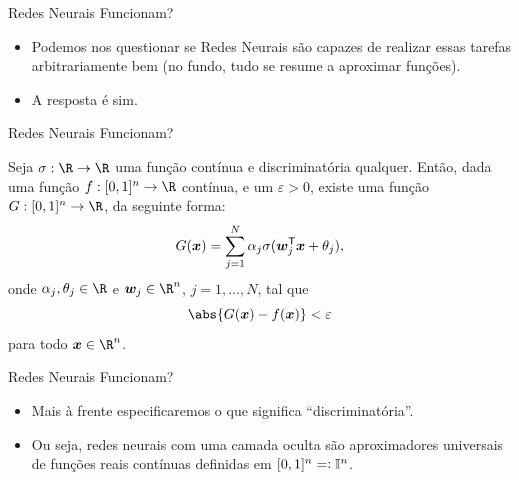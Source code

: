 \documentclass[13pt]{beamer}
\begin{document}

\begin{frame}{Redes Neurais Funcionam?}
    \begin{itemize}
        \item<1-> Podemos nos questionar se Redes Neurais são capazes de realizar essas tarefas arbitrariamente bem (no fundo, tudo se resume a aproximar funções).
        \item<2-> A resposta é sim.
    \end{itemize}
\end{frame}

\begin{frame}{Redes Neurais Funcionam?}
    \begin{TAU}
        Seja \( \sigma : \R \to \R \) uma função contínua e discriminatória qualquer.
        Então, dada uma função \( f : [0, 1]^{ n } \to \R \) contínua, e um \( \varepsilon > 0 \), existe uma função \( G : [0, 1]^{ n } \to \R \), da seguinte forma:
        \begin{equation*}
            G ( \bm{x} ) = \sum_{ j=1 }^{ N } \alpha_{ j } \sigma ( \bm{w}_{ j }^{ \mathsf{T} } \bm{x} + \theta_{ j } )
        ,\end{equation*}
        onde \( \alpha_{ j }, \theta_{ j } \in \R \) e \( \bfw_{ j } \in \R^{ n } \), \( j = 1, \dots, N \), tal que
        \begin{equation*}
            \abs{ G ( \bfx ) - f ( \bfx ) } < \varepsilon
        \end{equation*}
        para todo \( \bfx \in \R^{ n } \).
    \end{TAU}
\end{frame}

\begin{frame}{Redes Neurais Funcionam?}
    \begin{itemize}
        \item<1-> Mais à frente especificaremos o que significa ``discriminatória''.
        \item<2-> Ou seja, redes neurais com uma camada oculta são aproximadores universais de funções reais contínuas definidas em \( [0, 1]^{ n } = \vcentcolon \mathbb{I}^{ n } \).
    \end{itemize}
\end{frame}
\end{document}
